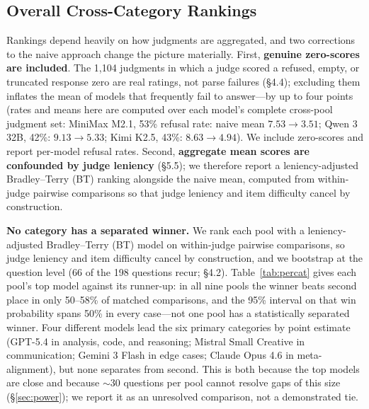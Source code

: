 \documentclass{article}
\begin{document}
\subsection{Overall Cross-Category Rankings}
\label{sec:overall}

Rankings depend heavily on how judgments are aggregated, and two corrections to the naive approach change the picture materially. First, \textbf{genuine zero-scores are included}. The 1,104 judgments in which a judge scored a refused, empty, or truncated response zero are real ratings, not parse failures (\S4.4); excluding them inflates the mean of models that frequently fail to answer---by up to four points (rates and means here are computed over each model's complete cross-pool judgment set: MiniMax M2.1, 53\% refusal rate: naive mean $7.53 \to 3.51$; Qwen 3 32B, 42\%: $9.13 \to 5.33$; Kimi K2.5, 43\%: $8.63 \to 4.94$). We include zero-scores and report per-model refusal rates. Second, \textbf{aggregate mean scores are confounded by judge leniency} (\S5.5); we therefore report a leniency-adjusted Bradley--Terry (BT) ranking alongside the naive mean, computed from within-judge pairwise comparisons so that judge leniency and item difficulty cancel by construction.

\textbf{No category has a separated winner.} We rank each pool with a leniency-adjusted Bradley--Terry (BT) model on within-judge pairwise comparisons, so judge leniency and item difficulty cancel by construction, and we bootstrap at the question level (66 of the 198 questions recur; \S4.2). Table~\ref{tab:percat} gives each pool's top model against its runner-up: in all nine pools the winner beats second place in only 50--58\% of matched comparisons, and the 95\% interval on that win probability spans 50\% in every case---not one pool has a statistically separated winner. Four different models lead the six primary categories by point estimate (GPT-5.4 in analysis, code, and reasoning; Mistral Small Creative in communication; Gemini 3 Flash in edge cases; Claude Opus 4.6 in meta-alignment), but none separates from second. This is both because the top models are close and because $\sim$30 questions per pool cannot resolve gaps of this size (\S\ref{sec:power}); we report it as an unresolved comparison, not a demonstrated tie.


\end{document}
